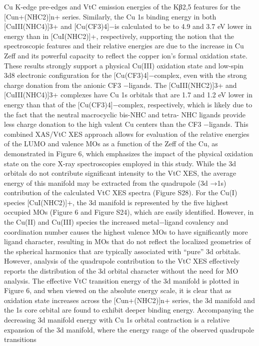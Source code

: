 \documentclass{article}
\begin{document}
Cu K-edge pre-edges and VtC emission energies of the Kβ2,5
features for the [Cun+(NHC2)]n+ series. Similarly, the Cu 1s
binding energy in both [CuIII(NHC4)]3+ and [Cu(CF3)4]−is
calculated to be to 4.9 and 3.7 eV lower in energy than in
[CuI(NHC2)]+, respectively, supporting the notion that the
spectroscopic features and their relative energies are due to the
increase in Cu Zeff and its powerful capacity to reﬂect the
copper ion’s formal oxidation state. These results strongly
support a physical Cu(III) oxidation state and low-spin 3d8
electronic conﬁguration for the [Cu(CF3)4]−complex, even
with the strong charge donation from the anionic CF3
−ligands.
The [CuIII(NHC2)]3+ and [CuIII(NHC4)]3+ complexes have
Cu 1s orbitals that are 1.7 and 1.2 eV lower in energy than that
of the [Cu(CF3)4]−complex, respectively, which is likely due
to the fact that the neutral macrocyclic bis-NHC and tetra-
NHC ligands provide less charge donation to the high valent
Cu centers than the CF3
−ligands.
This combined XAS/VtC XES approach allows for
evaluation of the relative energies of the LUMO and valence
MOs as a function of the Zeff of the Cu, as demonstrated in
Figure 6, which emphasizes the impact of the physical
oxidation state on the core X-ray spectroscopies employed in
this study. While the 3d orbitals do not contribute signiﬁcant
intensity to the VtC XES, the average energy of this manifold
may be extracted from the quadrupole (3d →1s) contribution
of the calculated VtC XES spectra (Figure S28). For the Cu(I)
species [CuI(NHC2)]+, the 3d manifold is represented by the
ﬁve highest occupied MOs (Figure 6 and Figure S24), which
are easily identiﬁed. However, in the Cu(II) and Cu(III)
species the increased metal−ligand covalency and coordination
number causes the highest valence MOs to have signiﬁcantly
more ligand character, resulting in MOs that do not reﬂect the
localized geometries of the spherical harmonics that are
typically associated with “pure” 3d orbitals. However, analysis
of the quadrupole contribution to the VtC XES eﬀectively
reports the distribution of the 3d orbital character without the
need for MO analysis. The eﬀective VtC transition energy of
the 3d manifold is plotted in Figure 6, and when viewed on the
absolute energy scale, it is clear that as oxidation state increases
across the [Cun+(NHC2)]n+ series, the 3d manifold and the 1s
core orbital are found to exhibit deeper binding energy.
Accompanying the decreasing 3d manifold energy with Cu 1s
orbital contraction is a relative expansion of the 3d manifold,
where the energy range of the observed quadrupole transitions
\end{document}
